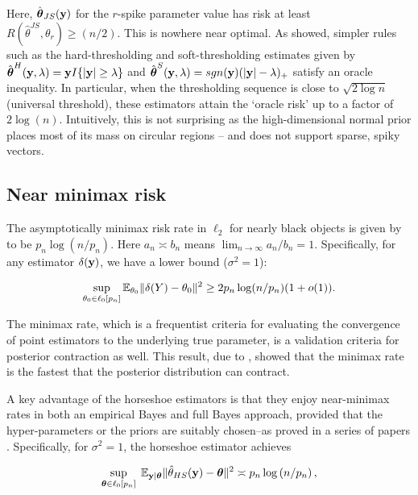 \documentclass[sts,preprint]{imsart}
\begin{document}
Here, ${\hat{\boldsymbol{\theta}}}_{JS}{}({\bf y})$ for the $r$-spike parameter value has risk at least $R\left( \hat{\theta}^{JS} , \theta_r \right) \geq (n/2)$. This is nowhere near optimal. As \citet{donoho1994ideal} showed, simpler rules such as the hard-thresholding and soft-thresholding estimates given by $\hat{\boldsymbol{\theta}}^{H}({\bf y},\lambda) = {\bf y} I\{\lvert{\bf y}\rvert \ge \lambda \}$ and
$\hat{\boldsymbol{\theta}}^{S}({\bf y},\lambda) = sgn({\bf y}) (\lvert{\bf y}\rvert - \lambda)_{+}$ satisfy an oracle inequality. In particular, when the thresholding sequence is close to
$\sqrt{2\log n}$ (universal threshold), these estimators attain the `oracle risk' up to a factor of $2\log(n)$. Intuitively, this is not
surprising as the high-dimensional normal prior places most of its mass on circular regions -- and does not support sparse, spiky vectors. 

\subsection{Near minimax risk}

The asymptotically minimax risk rate in $\ell_2$ for nearly black objects is given by \citet{donoho1992maximum} to be $p_n \log \left ( n / p_n \right )$. Here $a_n \asymp b_n$ means $\lim_{n\to\infty} a_n/b_n=1$. Specifically, for any estimator $\delta({\bf y})$, we have a lower bound ($\sigma^2  = 1$): 

\begin{equation}
  \sup_{\theta_0 \in \ell_0[p_n]} \mathbb E_{\theta_0} \lVert\delta(Y) - \theta_0\rVert^2
  \ge 2 p_n \log(n/p_n)(1+o(1)). 
\end{equation}

The minimax rate, which is a frequentist criteria for evaluating the convergence of point estimators to the underlying true parameter, is a validation criteria for posterior contraction as well. This result, due to \citet{ghosal2000}, showed that the minimax rate is the fastest that the posterior distribution can contract. 

A key advantage of the horseshoe estimators is that they enjoy near-minimax rates in both an empirical Bayes and full Bayes approach, provided that the hyper-parameters or the priors are suitably chosen--as proved in a series of papers \citep{van2014horseshoe,van2015conditions,van2016many,van2017adaptive}. Specifically, for $\sigma^2 = 1$, the horseshoe estimator achieves

\begin{equation}
  \sup_{ \boldsymbol{\theta} \in \ell_0[p_n] } \; \mathbb{E}_{ {\bf y} \mid \boldsymbol{\theta} } \lVert {\hat{\theta}}_{HS}{} ({\bf y}) -
  \boldsymbol{\theta} \rVert^2 \asymp p_n \log \left ( n / p_n \right ),
  \label{eq:minimax}
\end{equation}
\end{document}
